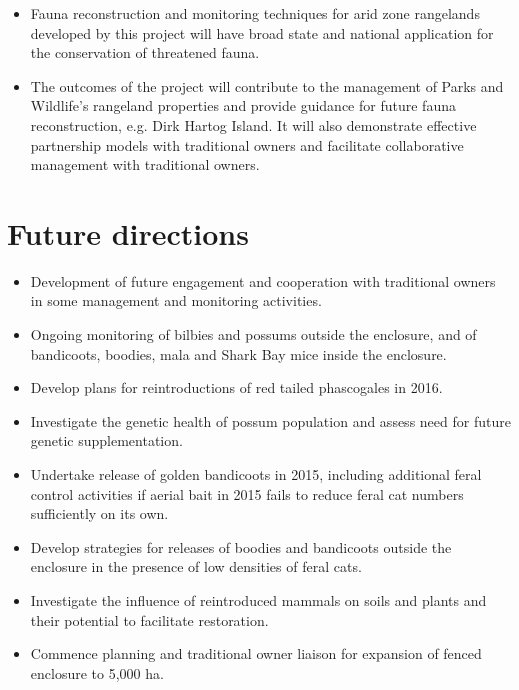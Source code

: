 \documentclass[version=last,
    paper=a4,                               %
    10pt,                                   %
    dvipsnames,
    oneside,                              %
    headings=openany,                       %
    open=any,
    BCOR=7mm,                               %
    DIV=15,     %
]{scrbook}
\begin{document}
\begin{itemize}
\itemsep1pt\parskip0pt
\item
  Fauna reconstruction and monitoring techniques for arid zone
  rangelands developed by this project will have broad state and
  national application for the conservation of threatened fauna.
\item
  The outcomes of the project will contribute to the management of Parks
  and Wildlife's rangeland properties and provide guidance for future
  fauna reconstruction, e.g. Dirk Hartog Island. It will also
  demonstrate effective partnership models with traditional owners and
  facilitate collaborative management with traditional owners.
\end{itemize}




\section*{Future directions}

\begin{itemize}
\itemsep1pt\parskip0pt
\item
  Development of future engagement and cooperation with traditional
  owners in some management and monitoring activities.
\item
  Ongoing monitoring of bilbies and possums outside the enclosure, and
  of bandicoots, boodies, mala and Shark Bay mice inside the enclosure.
\item
  Develop plans for reintroductions of red tailed phascogales in 2016.
\item
  Investigate the genetic health of possum population and assess need
  for future genetic supplementation.
\item
  Undertake release of golden bandicoots in 2015, including additional
  feral control activities if aerial bait in 2015 fails to reduce feral
  cat numbers sufficiently on its own.
\item
  Develop strategies for releases of boodies and bandicoots outside the
  enclosure in the presence of low densities of feral cats.
\item
  Investigate the influence of reintroduced mammals on soils and plants
  and their potential to facilitate restoration.
\item
  Commence planning and traditional owner liaison for expansion of
  fenced enclosure to 5,000 ha.
\end{itemize}



\end{document}
